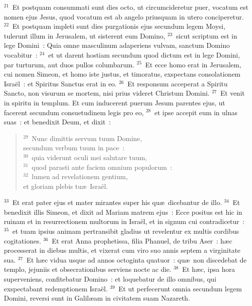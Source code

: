 ${}^{21}$~Et postquam consummati sunt dies octo, ut circumcideretur puer, vocatum est nomen ejus Jesus, quod vocatum est ab angelo priusquam in utero conciperetur.
${}^{22}$~Et postquam impleti sunt dies purgationis ejus secundum legem Moysi, tulerunt illum in Jerusalem, ut sisterent eum Domino,
${}^{23}$~sicut scriptum est in lege Domini~: Quia omne masculinum adaperiens vulvam, sanctum Domino vocabitur~:
${}^{24}$~et ut darent hostiam secundum quod dictum est in lege Domini, par turturum, aut duos pullos columbarum.
${}^{25}$~Et ecce homo erat in Jerusalem, cui nomen Simeon, et homo iste justus, et timoratus, exspectans consolationem Isra\"el~: et Spiritus Sanctus erat in eo.
${}^{26}$~Et responsum acceperat a Spiritu Sancto, non visurum se mortem, nisi prius videret Christum Domini.
${}^{27}$~Et venit in spiritu in templum. Et cum inducerent puerum Jesum parentes ejus, ut facerent secundum consuetudinem legis pro eo,
${}^{28}$~et ipse accepit eum in ulnas suas~: et benedixit Deum, et dixit~:
\begin{flushleft}\begin{verse}${}^{29}$~Nunc dimittis servum tuum Domine,\\ secundum verbum tuum in pace~:\\
${}^{30}$~quia viderunt oculi mei salutare tuum,\\
${}^{31}$~quod parasti ante faciem omnium populorum~:\\
${}^{32}$~lumen ad revelationem gentium,\\ et gloriam plebis tu\ae\ Isra\"el.\end{verse}\end{flushleft}


${}^{33}$~Et erat pater ejus et mater mirantes super his qu\ae\ dicebantur de illo.
${}^{34}$~Et benedixit illis Simeon, et dixit ad Mariam matrem ejus~: Ecce positus est hic in ruinam et in resurrectionem multorum in Isra\"el, et in signum cui contradicetur~:
${}^{35}$~et tuam ipsius animam pertransibit gladius ut revelentur ex multis cordibus cogitationes.
${}^{36}$~Et erat Anna prophetissa, filia Phanuel, de tribu Aser~: h\ae c processerat in diebus multis, et vixerat cum viro suo annis septem a virginitate sua.
${}^{37}$~Et h\ae c vidua usque ad annos octoginta quatuor~: qu\ae\ non discedebat de templo, jejuniis et obsecrationibus serviens nocte ac die.
${}^{38}$~Et h\ae c, ipsa hora superveniens, confitebatur Domino~: et loquebatur de illo omnibus, qui exspectabant redemptionem Isra\"el.
${}^{39}$~Et ut perfecerunt omnia secundum legem Domini, reversi sunt in Galil\ae am in civitatem suam Nazareth.


